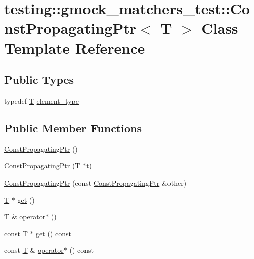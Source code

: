 \hypertarget{classtesting_1_1gmock__matchers__test_1_1_const_propagating_ptr}{}\section{testing\+:\+:gmock\+\_\+matchers\+\_\+test\+:\+:Const\+Propagating\+Ptr$<$ T $>$ Class Template Reference}
\label{classtesting_1_1gmock__matchers__test_1_1_const_propagating_ptr}
\subsection*{Public Types}
\begin{DoxyCompactItemize}
\item 
typedef \hyperlink{functions__7_8js_adf1f3edb9115acb0a1e04209b7a9937b}{T} \hyperlink{classtesting_1_1gmock__matchers__test_1_1_const_propagating_ptr_a2ad1f3127185fadd33eed42627ed5644}{element\+\_\+type}
\end{DoxyCompactItemize}
\subsection*{Public Member Functions}
\begin{DoxyCompactItemize}
\item 
\hyperlink{classtesting_1_1gmock__matchers__test_1_1_const_propagating_ptr_abdda67deda67ed234da2231fd86f05ed}{Const\+Propagating\+Ptr} ()
\item 
\hyperlink{classtesting_1_1gmock__matchers__test_1_1_const_propagating_ptr_a06da70663daa274fb8ca3352f039d609}{Const\+Propagating\+Ptr} (\hyperlink{functions__7_8js_adf1f3edb9115acb0a1e04209b7a9937b}{T} $\ast$t)
\item 
\hyperlink{classtesting_1_1gmock__matchers__test_1_1_const_propagating_ptr_ae7620c62ba340603968896d5d5400ed1}{Const\+Propagating\+Ptr} (const \hyperlink{classtesting_1_1gmock__matchers__test_1_1_const_propagating_ptr}{Const\+Propagating\+Ptr} \&other)
\item 
\hyperlink{functions__7_8js_adf1f3edb9115acb0a1e04209b7a9937b}{T} $\ast$ \hyperlink{classtesting_1_1gmock__matchers__test_1_1_const_propagating_ptr_a39a09d46453380ec1b8be8ce40adc453}{get} ()
\item 
\hyperlink{functions__7_8js_adf1f3edb9115acb0a1e04209b7a9937b}{T} \& \hyperlink{classtesting_1_1gmock__matchers__test_1_1_const_propagating_ptr_ad77bbeaa18f84cbd6f3dc7021904f1e3}{operator$\ast$} ()
\item 
const \hyperlink{functions__7_8js_adf1f3edb9115acb0a1e04209b7a9937b}{T} $\ast$ \hyperlink{classtesting_1_1gmock__matchers__test_1_1_const_propagating_ptr_ade099bee4b0eaa5ad099e517028b2e7a}{get} () const 
\item 
const \hyperlink{functions__7_8js_adf1f3edb9115acb0a1e04209b7a9937b}{T} \& \hyperlink{classtesting_1_1gmock__matchers__test_1_1_const_propagating_ptr_a20a9b4f384b63bf52cf8caa138852f8e}{operator$\ast$} () const 
\end{DoxyCompactItemize}


